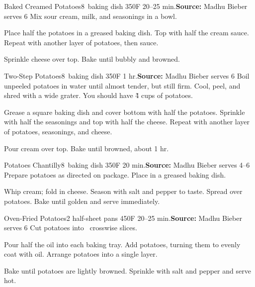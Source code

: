\begin{recipe}{Baked Creamed Potatoes}{8\inch{}\inch\ baking dish \hfill 350\0F \hfill 20--25 min.}{\textbf{Source:} Madhu Bieber \hfill serves 6}
 Mix sour cream, milk, and seasonings in a bowl.

 Place half the potatoes in a greased baking dish. Top with half the cream sauce. Repeat with another layer of potatoes, then sauce.

 Sprinkle cheese over top. Bake until bubbly and browned.
\end{recipe}

\begin{recipe}{Two-Step Potatoes}{8\inch{}\inch\ baking dish \hfill 350\0F \hfill 1 hr.}{\textbf{Source:} Madhu Bieber \hfill serves 6}
 Boil unpeeled potatoes in water until almost tender, but still firm. Cool, peel, and shred with a wide grater. You should have \~4 cups of potatoes.

 Grease a square baking dish and cover bottom with half the potatoes. Sprinkle with half the seasonings and top with half the cheese. Repeat with another layer of potatoes, seasonings, and cheese.

 Pour cream over top. Bake until browned, about 1 hr.
\end{recipe}

\begin{recipe}{Potatoes Chantilly}{8\inch{}\inch\ baking dish \hfill 350\0F \hfill 20 min.}{\textbf{Source:} Madhu Bieber \hfill serves 4--6}
 Prepare potatoes as directed on package. Place in a greased baking dish.

 Whip cream; fold in cheese. Season with salt and pepper to taste. Spread over potatoes. Bake until golden and serve immediately.
\end{recipe}

\begin{recipe}{Oven-Fried Potatoes}{2 half-sheet pans \hfill 450\0F \hfill 20--25 min.}{\textbf{Source:} Madhu Bieber \hfill serves 6}
 Cut potatoes into \inch\ crosswise slices.

 Pour half the oil into each baking tray. Add potatoes, turning them to evenly coat with oil. Arrange potatoes into a single layer.

 \newstep Bake until potatoes are lightly browned. Sprinkle with salt and pepper and serve hot.
\end{recipe}

